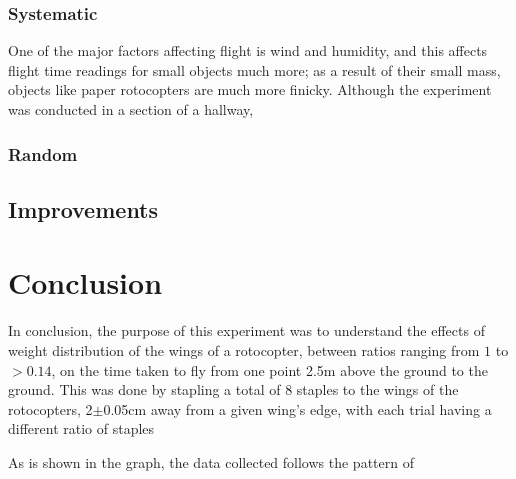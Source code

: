\documentclass[]{article}
\begin{document}
\subsubsection{Systematic}

One of the major factors affecting flight is wind and humidity, and this affects flight time readings for small objects much more; as a result of their small mass, objects like paper rotocopters are much more finicky. Although the experiment was conducted in a section of a hallway, 

\subsubsection{Random}

\subsection{Improvements}

\section{Conclusion}
In conclusion, the purpose of this experiment was to understand the effects of weight distribution of the wings of a rotocopter, between ratios ranging from $1$ to $>0.14$, on the time taken to fly from one point 2.5m above the ground to the ground. This was done by stapling a total of 8 staples to the wings of the rotocopters, 2$\pm$0.05cm away from a given wing's edge, with each trial having a different ratio of staples 

As is shown in the graph, the data collected follows the pattern of 
\end{document}
